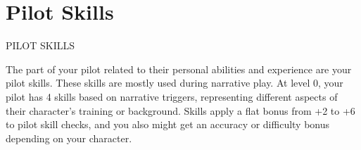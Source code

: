 \chapter{Pilot Skills}
                                              PILOT SKILLS

The part of your pilot related to their personal abilities and experience are your pilot skills. These
skills are mostly used during narrative play. At level 0, your pilot has 4 skills based on narrative
triggers, representing different aspects of their character’s training or background. Skills apply a
flat bonus from +2 to +6 to pilot skill checks, and you also might get an accuracy or difficulty
bonus depending on your character.